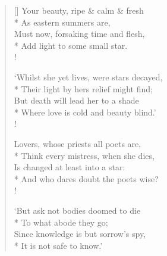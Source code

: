 \documentclass[MAIN]{subfiles}
\begin{document}
\settowidth{\versewidth}{Must now, forsaking time and flesh,}
\begin{verse}[\versewidth]
Your beauty, ripe \& calm \& fresh\\*
\vin As eastern summers are,\\
Must now, forsaking time and flesh,\\*
\vin Add light to some small star.\\!

`Whilst she yet lives, were stars decayed,\\*
\vin Their light by hers relief might find;\\
But death will lead her to a shade\\*
\vin Where love is cold and beauty blind.'\\!

Lovers, whose priests all poets are,\\*
\vin Think every mistress, when she dies,\\
Is changed at least into a star:\\*
\vin And who dares doubt the poets wise?\\!

`But ask not bodies doomed to die\\*
\vin To what abode they go;\\
Since knowledge is but sorrow's spy,\\*
\vin It is not safe to know.'
\end{verse}
\end{document}
